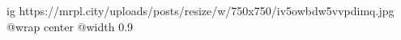  
 
 
 
 

\ifcmt
  ig https://mrpl.city/uploads/posts/resize/w/750x750/iv5owbdw5vvpdimq.jpg
  @wrap center
  @width 0.9
\fi
